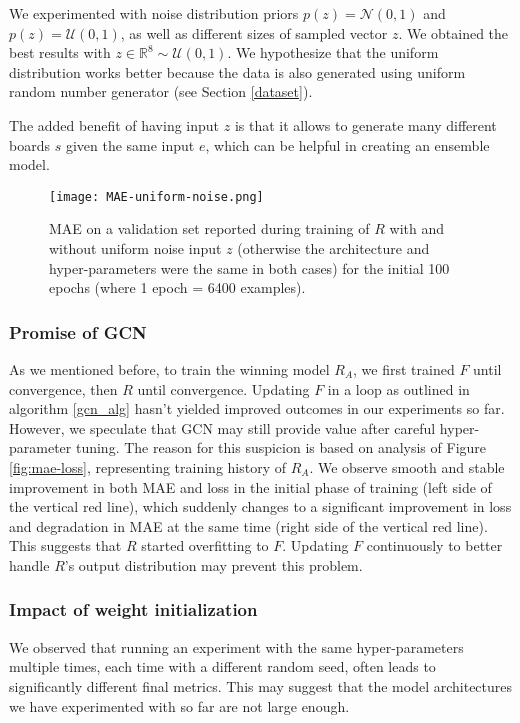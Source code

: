 \documentclass[conference]{IEEEtran}
\begin{document}
We experimented with noise distribution priors $p(z) = \mathcal{N}(0,1)$ and $p(z) = \mathcal{U}(0,1)$, as well as different sizes of sampled vector $z$. We obtained the best results with $z \in \mathbb{R}^8 \sim \mathcal{U}(0,1)$. We hypothesize that the uniform distribution works better because the data is also generated using uniform random number generator (see Section \ref{dataset}).

The added benefit of having input $z$ is that it allows to generate many different boards $s$ given the same input $e$, which can be helpful in creating an ensemble model.

\begin{figure}[!h]
    \centering
    \texttt{[image: MAE-uniform-noise.png]}
    \caption{MAE on a validation set reported during training of $R$ with and without uniform noise input $z$ (otherwise the architecture and hyper-parameters were the same in both cases) for the initial 100 epochs (where 1 epoch = 6400 examples).}
    \label{fig:noise}
\end{figure}


\subsubsection{Promise of GCN}
\label{promise}
As we mentioned before, to train the winning model $R_A$, we first trained $F$ until convergence, then $R$ until convergence. Updating $F$ in a loop as outlined in algorithm \ref{gcn_alg} hasn't yielded improved outcomes in our experiments so far. However, we speculate that GCN may still provide value after careful hyper-parameter tuning. The reason for this suspicion is based on analysis of Figure \ref{fig:mae-loss}, representing training history of $R_A$. We observe smooth and stable improvement in both MAE and loss in the initial phase of training (left side of the vertical red line), which suddenly changes to a significant improvement in loss and degradation in MAE at the same time (right side of the vertical red line). This suggests that $R$ started overfitting to $F$. Updating $F$ continuously to better handle $R$'s output distribution may prevent this problem.


\subsubsection{Impact of weight initialization}
We observed that running an experiment with the same hyper-parameters multiple times, each time with a different random seed, often leads to significantly different final metrics. This may suggest that the model architectures we have experimented with so far are not large enough.\cite{frankle2019lottery}
\end{document}
